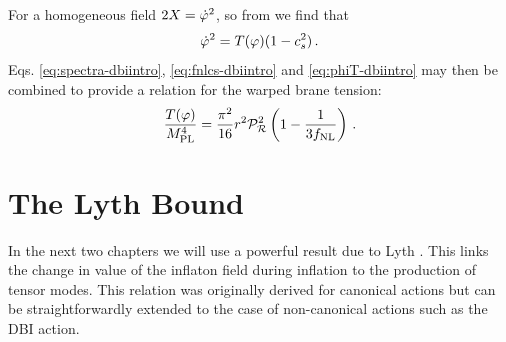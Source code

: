 For a homogeneous field $2X = \dot{\varphi}^2$, so from  we
find that
\begin{equation}
\label{eq:phiT-dbiintro}
 \dot{\varphi}^2 = T(\varphi)(1-c_s^2)\,.
\end{equation}
Eqs. \eqref{eq:spectra-dbiintro},
\eqref{eq:fnlcs-dbiintro} and \eqref{eq:phiT-dbiintro}
may then be combined to provide a relation for the warped brane tension: 
% 
\begin{equation}
\label{eq:obswarp-dbiintro}
\frac{T (\varphi)}{M_{\mathrm{PL}}^4}  = 
\frac{\pi^2}{16} r^2\mathcal{P}_{\mathcal{R}}^2  \left( 1-\frac{1}{3f_{\mathrm{NL}}} \right) \,.
\end{equation}
% 


\section{The Lyth Bound}
\label{sec:lyth-dbiintro}
In the next two chapters we will use a powerful result due to Lyth \cite{lyth}. This
links the change in value of the inflaton field during inflation to the production of tensor
modes. This relation was originally derived for canonical actions but can be straightforwardly
extended to the case of non-canonical actions such as the DBI action.

